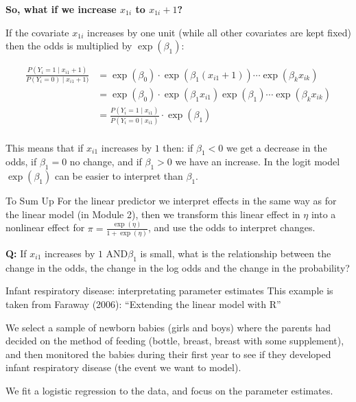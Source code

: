 \documentclass[
  ignorenonframetext,
]{beamer}
\begin{document}
\begin{frame}
\textbf{So, what if we increase \(x_{1i}\) to \(x_{1i}+1\)?}

If the covariate \(x_{1i}\) increases by one unit (while all other
covariates are kept fixed) then the odds is multiplied by
\(\exp(\beta_1)\):

\begin{align*}
\frac{P(Y_i=1\mid x_{i1}+1)}{P(Y_i=0)\mid x_{i1}+1)}&=\exp(\beta_0)\cdot \exp(\beta_1 (x_{i1}+1))\cdots\exp(\beta_k x_{ik})\\
&=\exp(\beta_0)\cdot \exp(\beta_1 x_{i1})\exp(\beta_1)\cdots\exp(\beta_k x_{ik})\\
&=\frac{P(Y_i=1\mid x_{i1})}{P(Y_i=0\mid x_{i1})}\cdot \exp(\beta_1)\\
\end{align*}

This means that if \(x_{i1}\) increases by \(1\) then: if \(\beta_1<0\)
we get a decrease in the odds, if \(\beta_1=0\) no change, and if
\(\beta_1>0\) we have an increase. In the logit model \(\exp(\beta_1)\)
can be easier to interpret than \(\beta_1\).
\end{frame}

\begin{frame}
\begin{block}{To Sum Up}
\protect\hypertarget{to-sum-up}{}
For the linear predictor we interpret effects in the same way as for the
linear model (in Module 2), then we transform this linear effect in
\(\eta\) into a nonlinear effect for
\(\pi=\frac{\exp(\eta)}{1+\exp(\eta)}\), and use the odds to interpret
changes.

\textbf{Q:} If \(x_{i1}\) increases by \(1\) AND\(\beta_1\) is small,
what is the relationship between the change in the odds, the change in
the log odds and the change in the probability?
\end{block}
\end{frame}

\begin{frame}
\begin{block}{Infant respiratory disease: interpretating parameter
estimates}
\protect\hypertarget{infant-respiratory-disease-interpretating-parameter-estimates}{}
This example is taken from Faraway (2006): ``Extending the linear model
with R''

We select a sample of newborn babies (girls and boys) where the parents
had decided on the method of feeding (bottle, breast, breast with some
supplement), and then monitored the babies during their first year to
see if they developed infant respiratory disease (the event we want to
model).

We fit a logistic regression to the data, and focus on the parameter
estimates.
\end{block}
\end{frame}
\end{document}
